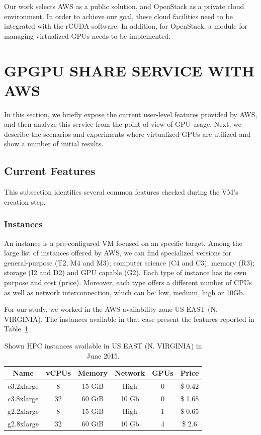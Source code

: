 \documentclass[a4paper,twoside]{article}
\begin{document}
Our work selects AWS as a public 
solution, and OpenStack as a private cloud environment. 
In order to achieve our goal, these cloud facilities need to be integrated with the {rCUDA} software. In addition, for OpenStack, a module for managing virtualized GPUs 
needs to be implemented.  



\section{\uppercase{GPGPU share service with AWS}}
\label{sec:workingaws}
In this section, we briefly expose the current user-level features 
provided by AWS, and then analyze this service  
from the point of view of GPU usage. 
Next, we describe the scenarios and experiments where virtualized GPUs are utilized and show a number of initial results.

\subsection{Current Features}
This subsection identifies several common features checked during 
the VM's creation step.

\subsubsection{Instances}

An instance is a pre-configured VM focused on an 
specific target. Among the large list of instances offered by AWS, 
we can find specialized versions for general-purpose (T2, M4 and M3); computer science (C4 and C3); memory (R3); storage (I2 and D2) and 
GPU capable (G2). Each type of instance has its own purpose and cost (price). 
Moreover, each type offers a different number of CPUs as well as network 
interconnection, which can be: low, medium, high or 10Gb.

For our study, we worked in the AWS availability zone US EAST (N. VIRGINIA). 
The instances available in that case present the features reported in Table~\ref{table:awsInstances}. 

\begin{table}[htb]
\renewcommand{\arraystretch}{1.3}
\caption{Shown HPC instances available in US EAST (N. VIRGINIA) in June 2015.}
\label{table:awsInstances}
\tabcolsep=0.09cm
\begin{center}\begin{tabular}{cccccc}
Name & vCPUs & Memory & Network & GPUs & Price\\ \hline \hline
c3.2xlarge & 8 & 15 GiB & High & 0 & \$ 0.42\\ \hline
c3.8xlarge & 32 & 60 GiB & 10 Gb & 0 & \$ 1.68 \\ \hline
g2.2xlarge & 8 & 15 GiB & High & 1 & \$ 0.65\\ \hline
g2.8xlarge & 32 & 60 GiB & 10 Gb & 4 & \$ 2.6 \\ \hline
\end{tabular}\end{center}\end{table}
\end{document}
